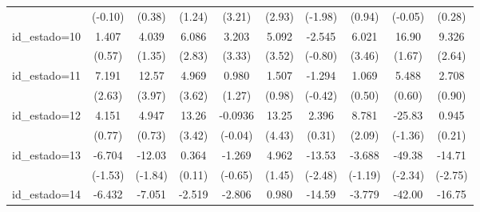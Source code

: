 {\begin{tabular}{l*{9}{c}}
                    &     (-0.10)         &      (0.38)         &      (1.24)         &      (3.21)         &      (2.93)         &     (-1.98)         &      (0.94)         &     (-0.05)         &      (0.28)         \\
[1em]
id\_estado=10        &       1.407         &       4.039         &       6.086\sym{**} &       3.203\sym{***}&       5.092\sym{***}&      -2.545         &       6.021\sym{***}&       16.90         &       9.326\sym{**} \\
                    &      (0.57)         &      (1.35)         &      (2.83)         &      (3.33)         &      (3.52)         &     (-0.80)         &      (3.46)         &      (1.67)         &      (2.64)         \\
[1em]
id\_estado=11        &       7.191\sym{**} &       12.57\sym{***}&       4.969\sym{***}&       0.980         &       1.507         &      -1.294         &       1.069         &       5.488         &       2.708         \\
                    &      (2.63)         &      (3.97)         &      (3.62)         &      (1.27)         &      (0.98)         &     (-0.42)         &      (0.50)         &      (0.60)         &      (0.90)         \\
[1em]
id\_estado=12        &       4.151         &       4.947         &       13.26\sym{***}&     -0.0936         &       13.25\sym{***}&       2.396         &       8.781\sym{*}  &      -25.83         &       0.945         \\
                    &      (0.77)         &      (0.73)         &      (3.42)         &     (-0.04)         &      (4.43)         &      (0.31)         &      (2.09)         &     (-1.36)         &      (0.21)         \\
[1em]
id\_estado=13        &      -6.704         &      -12.03         &       0.364         &      -1.269         &       4.962         &      -13.53\sym{*}  &      -3.688         &      -49.38\sym{*}  &      -14.71\sym{**} \\
                    &     (-1.53)         &     (-1.84)         &      (0.11)         &     (-0.65)         &      (1.45)         &     (-2.48)         &     (-1.19)         &     (-2.34)         &     (-2.75)         \\
[1em]
id\_estado=14        &      -6.432\sym{*}  &      -7.051         &      -2.519         &      -2.806         &       0.980         &      -14.59\sym{***}&      -3.779         &      -42.00\sym{***}&      -16.75\sym{***}\\

\end{tabular}}
